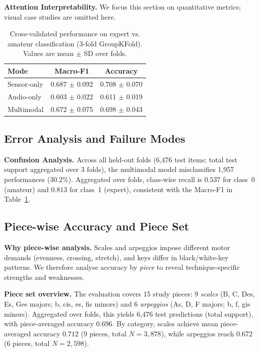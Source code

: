 \documentclass[sigconf,review,anonymous]{acmart}
\begin{document}

\textbf{Attention Interpretability.}
We focus this section on quantitative metrics; visual case studies are omitted here.

\begin{table}[t]
  \centering
\caption{Cross-validated performance on expert vs. amateur classification (3-fold GroupKFold). Values are mean $\pm$ SD over folds.}
  \label{tab:main_results}
  \begin{tabular}{lcc}
    \hline
    Mode & Macro-F1 & Accuracy \\
    \hline
    Sensor-only & 0.687 $\pm$ 0.092 & 0.708 $\pm$ 0.070 \\
    Audio-only  & 0.603 $\pm$ 0.022 & 0.611 $\pm$ 0.019 \\
    Multimodal  & 0.672 $\pm$ 0.075 & 0.698 $\pm$ 0.043 \\
    \hline
  \end{tabular}
\end{table}

\subsection{Error Analysis and Failure Modes}

\textbf{Confusion Analysis.}
Across all held‑out folds (6{,}476 test items; total test support aggregated over 3 folds), the multimodal model misclassifies 1{,}957 performances (30.2\%). Aggregated over folds, class‑wise recall is $0.537$ for class~0 (amateur) and $0.813$ for class~1 (expert), consistent with the Macro‑F1 in Table~\ref{tab:main_results}.

\subsection{Piece-wise Accuracy and Piece Set}
\textbf{Why piece-wise analysis.}
Scales and arpeggios impose different motor demands (evenness, crossing, stretch), and keys differ in black/white-key patterns. We therefore analyse accuracy by \emph{piece} to reveal technique-specific strengths and weaknesses.

\textbf{Piece set overview.}
The evaluation covers 15 study pieces: 9 \emph{scales} (B, C, Des, Es, Ges majors; b, cis, es, fis minors) and 6 \emph{arpeggios} (As, D, F majors; b, f, gis minors). Aggregated over folds, this yields 6{,}476 test predictions (total support), with piece-averaged accuracy $0.696$. By category, scales achieve mean piece-averaged accuracy $0.712$ (9 pieces, total $N{=}3{,}878$), while arpeggios reach $0.672$ (6 pieces, total $N{=}2{,}598$).
\end{document}
